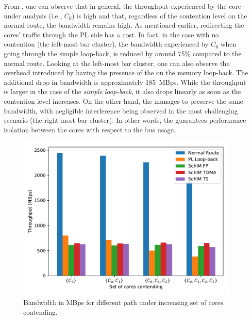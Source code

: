 From , one can observe that in general,
the throughput experienced by the core under analysis (i.e., $C_{0}$)
is high and that, regardless of the contention level on the normal
route, the bandwidth remains high. As mentioned earlier, redirecting
the cores' traffic through the PL side has a cost. In fact, in the
case with no contention (the left-most bar cluster), the bandwidth
experienced by $C_{0}$ when going through the simple loop-back, is
reduced by around 75\% compared to the normal route.  Looking at the
left-most bar cluster, one can also observe the overhead introduced by
having the presence of the \schim on the memory loop-back. The
additional drop in bandwidth is approximately 185~MBps.  While the
throughput is larger in the case of the \emph{simple loop-back}, it
also drops linearly as soon as the contention level increases.  On the
other hand, the \schim manages to preserve the same bandwidth, with
negligible interference being observed in the most challenging
scenario (the right-most bar cluster). In other words, the \schim
guarantees performance isolation between the cores with respect to the
bus usage.

\begin{figure}
  \centering
  \includegraphics[scale=0.5]{images/bw_comparisons.pdf}
  \caption{Bandwidth in MBps for different path under increasing set of cores contending.}
  \label{fig:bandwidth_comparison}
\end{figure}

